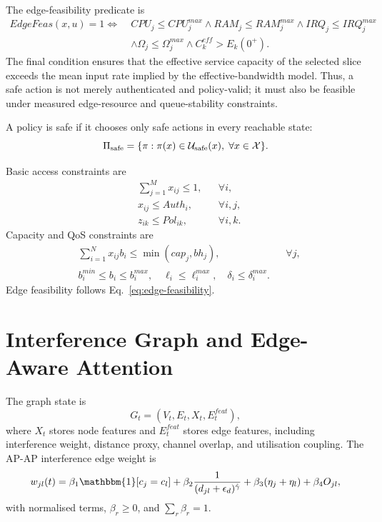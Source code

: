 The edge-feasibility predicate is
\begin{equation}
\begin{aligned}
  EdgeFeas(x,u)=1
  \Longleftrightarrow\;&
  CPU_j\leq CPU_j^{max}
  \land RAM_j\leq RAM_j^{max}
  \land IRQ_j\leq IRQ_j^{max} \\
  &\land \Omega_j\leq\Omega_j^{max}
  \land C_k^{eff}>E_k(0^+).
\end{aligned}
\label{eq:edge-feasibility}
\end{equation}
The final condition ensures that the effective service capacity of the selected slice
exceeds the mean input rate implied by the effective-bandwidth model. Thus, a safe
action is not merely authenticated and policy-valid; it must also be feasible under
measured edge-resource and queue-stability constraints.

\begin{definition}
A policy is safe if it chooses only safe actions in every reachable state:
\begin{equation}
  \Pi_{\mathrm{safe}}=
  \{\pi:\pi(x)\in\mathcal{U}_{\mathrm{safe}}(x),\;\forall x\in\mathcal{X}\}.
  \label{eq:pisafe-corrected}
\end{equation}
\end{definition}

Basic access constraints are
\begin{align}
  &\sum_{j=1}^M x_{ij}\leq1, &&\forall i,
  \label{eq:single-ap}\\
  &x_{ij}\leq Auth_i, &&\forall i,j,
  \label{eq:auth-req}\\
  &z_{ik}\leq Pol_{ik}, &&\forall i,k.
  \label{eq:policy-req}
\end{align}
Capacity and QoS constraints are
\begin{align}
  &\sum_{i=1}^{N}x_{ij}b_i\leq \min(cap_j,bh_j), &&\forall j,
  \label{eq:capacity}\\
  &b_i^{min}\leq b_i\leq b_i^{max},\quad
  \ell_i\leq\ell_i^{max},\quad
  \delta_i\leq\delta_i^{max}.
  \label{eq:qos}
\end{align}
Edge feasibility follows Eq.~\eqref{eq:edge-feasibility}.

\section{Interference Graph and Edge-Aware Attention}
\label{sec:interference-graph}

The graph state is
\begin{equation}
  G_t=(V_t,E_t,X_t,E_t^{feat}),
  \label{eq:edge-feature-graph}
\end{equation}
where $X_t$ stores node features and $E_t^{feat}$ stores edge features, including
interference weight, distance proxy, channel overlap, and utilisation coupling. The
AP-AP interference edge weight is
\begin{equation}
  w_{jl}(t)
  =
  \beta_1\mathbbm{1}[c_j=c_l]
  +\beta_2\frac{1}{(d_{jl}+\epsilon_d)^{\hat{\gamma}}}
  +\beta_3(\eta_j+\eta_l)
  +\beta_4O_{jl},
  \label{eq:edge-weight}
\end{equation}
with normalised terms, $\beta_r\geq0$, and $\sum_r\beta_r=1$.

